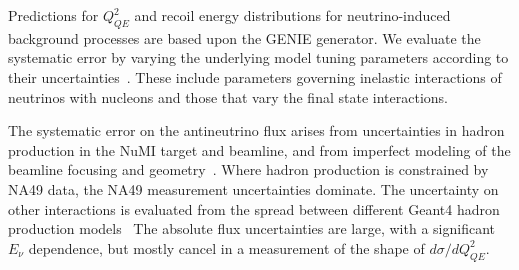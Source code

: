 Predictions for $Q^{2}_{QE}$ and recoil energy distributions for neutrino-induced background processes are based upon the GENIE generator. We evaluate the systematic error by varying the underlying model tuning parameters according to their uncertainties~\cite{Andreopoulos201087}. These include parameters governing inelastic interactions of neutrinos with nucleons and those that vary the final state interactions.  

The systematic error on the antineutrino flux arises from uncertainties in hadron production in the NuMI target and beamline, and from imperfect modeling of the beamline focusing and geometry~\cite{Pavlovic:2008zz}.  Where hadron production is constrained by NA49 data\cite{Alt:2006fr}, the NA49 measurement uncertainties dominate.  The uncertainty on other interactions is evaluated from the spread between different Geant4 hadron production models~
\cite{Agostinelli2003250,1610988}
The absolute flux uncertainties are large, with a significant $E_\nu$ dependence, but mostly cancel in a measurement of the shape of $d\sigma /dQ^2_{QE}$.







